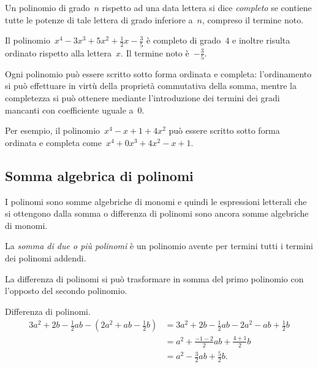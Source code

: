 \begin{definizione}
Un polinomio di grado~\(n\) rispetto ad una data lettera si dice 
\emph{completo} se contiene tutte le potenze di tale lettera di grado 
inferiore a~\(n\), compreso il termine noto.
\end{definizione}
\begin{exrig}
\begin{esempio}
Il polinomio~\(x^4-3x^3+5x^2+\frac{1}{2}x-\frac{3}{5}\) è completo di 
grado~\(4\) e inoltre risulta ordinato rispetto alla lettera~\(x\). Il termine 
noto è~\(-\frac{3}{5}\).
\end{esempio}
\end{exrig}

\osservazione
Ogni polinomio può essere scritto sotto forma ordinata e completa: 
l'ordinamento si può effettuare in virtù della proprietà commutativa della 
somma, mentre
la completezza si può ottenere mediante l'introduzione dei termini dei 
gradi mancanti con coefficiente uguale a~\(0\).

Per esempio, il polinomio~\(x^4-x+1+4x^2\) può essere scritto sotto forma 
ordinata e completa come~\(x^4+0x^3+4x^2-x+1\).


\subsection{Somma algebrica di polinomi}
\label{subsec:10_poli_somma}

I polinomi sono somme algebriche di monomi e quindi le espressioni 
letterali che si ottengono dalla somma
o differenza di polinomi sono ancora somme algebriche di monomi.

\begin{definizione}
La \emph{somma di due o più polinomi} è un polinomio avente per termini 
tutti i termini dei polinomi addendi.
\end{definizione}

La differenza di polinomi si può trasformare in somma del primo polinomio 
con l'opposto del secondo polinomio.

\begin{exrig}
\begin{esempio}
Differenza di polinomi.
\begin{equation*}
\begin{split}
3a^2+2b-\frac{1}{2}ab-\left(2a^2+ab-\frac{1}{2}b\right)&=3a^2+2b-\frac{1}{2}
ab-2a^2-ab+\frac{1}{2}b\\
&=a^2+\frac{-1-2}{2}ab+\frac{4+1}{2}b\\
&=a^2-\frac{3}{2}ab+\frac{5}{2}b.
\end{split}
\end{equation*}
\end{esempio}
\end{exrig}


